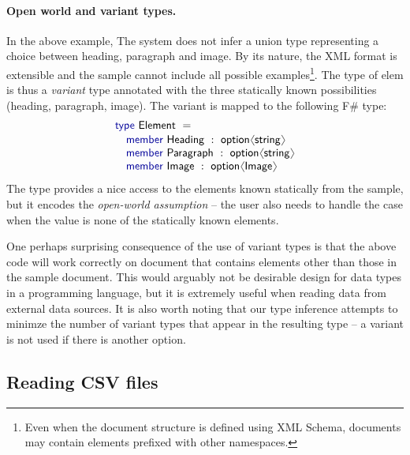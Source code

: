 \documentclass[10pt,preprint,clearpagebib]{sigplanconf}
\newcommand{\langl}{\begin{picture}(4.5,7)
\put(1.1,2.5){\rotatebox{60}{\line(1,0){5.5}}}
\put(1.1,2.5){\rotatebox{300}{\line(1,0){5.5}}}
\end{picture}}
\newcommand{\rangl}{\begin{picture}(4.5,7)
\put(.9,2.5){\rotatebox{120}{\line(1,0){5.5}}}
\put(.9,2.5){\rotatebox{240}{\line(1,0){5.5}}}
\end{picture}}
\newcommand{\kvd}[1]{\textnormal{\textcolor{kvdclr}{\sffamily #1}}}
\newcommand{\ident}[1]{\textnormal{\sffamily #1}}
\begin{document}
\paragraph{Open world and variant types.}
In the above example, The system does not infer a union type representing a choice between
heading, paragraph and image. By its nature, the XML format is extensible and the sample cannot 
include all possible examples\footnote{Even when the document structure is defined using XML 
Schema, documents may contain elements prefixed with other namespaces.}. The type of \ident{elem}
is thus a \emph{variant} type annotated with the three statically known possibilities (heading,
paragraph, image). The variant is mapped to the following F\# type:
%
\begin{equation*}
\begin{array}{l}
 \kvd{type}~\ident{Element}~=  \\[0.1em]
 \quad \kvd{member}~\ident{Heading}~:~\ident{option}\langl \ident{string} \rangl\\
 \quad \kvd{member}~\ident{Paragraph}~:~\ident{option}\langl \ident{string} \rangl\\
 \quad \kvd{member}~\ident{Image}~:~\ident{option}\langl \ident{Image} \rangl\\
\end{array}
\end{equation*}
%
The type provides a nice access to the elements known statically from the sample, but it encodes
the \emph{open-world assumption} -- the user also needs to handle the case when the value is none 
of the statically known elements. 

One perhaps surprising consequence of the use of variant types is that the above code will work
correctly on document that contains elements other than those in the sample document. This would 
arguably not be desirable design for data types in a programming language, but it is extremely
useful when reading data from external data sources. It is also worth noting that our type 
inference attempts to minimze the number of variant types that appear in the resulting type --
a variant is not used if there is another option.


\subsection{Reading CSV files}
\label{sec:providers-csv}
\end{document}
